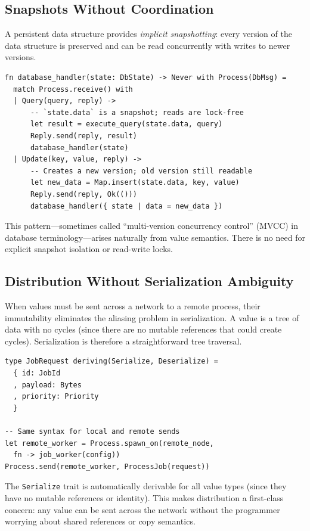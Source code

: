 \documentclass[11pt]{article}
\theoremstyle{definition}
\theoremstyle{remark}
\begin{document}
\subsection{Snapshots Without Coordination}

A persistent data structure provides \emph{implicit snapshotting}:
every version of the data structure is preserved and can be read
concurrently with writes to newer versions.

\begin{lstlisting}[caption={Implicit snapshotting with persistent maps.}]
fn database_handler(state: DbState) -> Never with Process(DbMsg) =
  match Process.receive() with
  | Query(query, reply) ->
      -- `state.data` is a snapshot; reads are lock-free
      let result = execute_query(state.data, query)
      Reply.send(reply, result)
      database_handler(state)
  | Update(key, value, reply) ->
      -- Creates a new version; old version still readable
      let new_data = Map.insert(state.data, key, value)
      Reply.send(reply, Ok(()))
      database_handler({ state | data = new_data })
\end{lstlisting}

This pattern---sometimes called ``multi-version concurrency control''
(MVCC) in database terminology---arises naturally from value semantics.
There is no need for explicit snapshot isolation or read-write locks.

\subsection{Distribution Without Serialization Ambiguity}

When values must be sent across a network to a remote process, their
immutability eliminates the aliasing problem in serialization.  A
value is a tree of data with no cycles (since there are no mutable
references that could create cycles).  Serialization is therefore a
straightforward tree traversal.

\begin{lstlisting}[caption={Transparent distribution of values.}]
type JobRequest deriving(Serialize, Deserialize) =
  { id: JobId
  , payload: Bytes
  , priority: Priority
  }

-- Same syntax for local and remote sends
let remote_worker = Process.spawn_on(remote_node,
  fn -> job_worker(config))
Process.send(remote_worker, ProcessJob(request))
\end{lstlisting}

The \texttt{Serialize} trait is automatically derivable for all value
types (since they have no mutable references or identity).  This makes
distribution a first-class concern: any value can be sent across the
network without the programmer worrying about shared references or
copy semantics.
\end{document}
